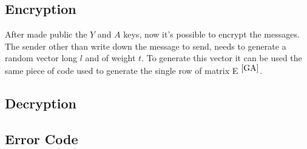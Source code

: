 \subsection{Encryption}
After made public the $Y$ and $A$ keys, now it's possible to encrypt the messages. The sender other than write down the message to send, needs to generate a random vector long $l$ and of weight $t$.
To generate this vector it can be used the same piece of code used to generate the single row of matrix E $^{\ref{GA}}$.

\subsection{Decryption}
\subsection{Error Code}
